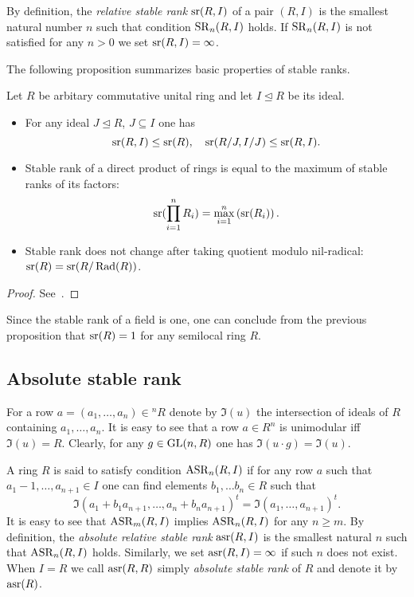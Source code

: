 By definition, the {\it relative stable rank} $\operatorname{sr}(R, I)$ of a pair $(R, I)$ is the smallest natural number $n$ such that condition $\operatorname{SR}_n(R, I)$ holds.
If $\operatorname{SR}_n(R, I)$ is not satisfied for any $n>0$ we set $\operatorname{sr}(R, I)=\infty$.

The following proposition summarizes basic properties of stable ranks.
\begin{prop} \label{prop:sr_properties} Let $R$ be arbitary commutative unital ring and let $I\trianglelefteq R$ be its ideal.
 \begin{itemize}
  \item For any ideal $J\trianglelefteq R$, $J\subseteq I$ one has $$\operatorname{sr}(R, I)\leq\operatorname{sr}(R),\quad \operatorname{sr}(R/J, I/J)\leq \operatorname{sr}(R, I).$$
  \item Stable rank of a direct product of rings is equal to the maximum of stable ranks of its factors: $$\operatorname{sr}(\prod\limits_{i=1}^n R_i) = \max\limits_{i=1}^n\left(\operatorname{sr}(R_i)\right).$$
  \item Stable rank does not change after taking quotient modulo nil-radical: $\operatorname{sr}(R)=\operatorname{sr}(R/\operatorname{Rad}(R))$.
 \end{itemize}\end{prop} \begin{proof} See~\cite{Va71}. \end{proof}

\begin{example} Since the stable rank of a field is one, one can conclude from the previous proposition that $\operatorname{sr}(R)=1$ for any semilocal ring $R$. \end{example}

\subsection{Absolute stable rank}
For a row $a=(a_1,\ldots, a_n) \in {}^n\!R$ denote by $\mathfrak{I}(u)$ the intersection of ideals of $R$ containing $a_1, \ldots, a_n$.
It is easy to see that a row $a\in R^n$ is unimodular iff $\mathfrak{I}(u)=R$. 
Clearly, for any $g\in\operatorname{GL}(n, R)$ one has $\mathfrak{I}(u\cdot g)=\mathfrak{I}(u)$.

A ring $R$ is said to satisfy condition $\operatorname{ASR}_{n}(R, I)$ if for any row $a$ such that $a_1-1,\ldots,a_{n+1}\in I$ 
one can find elements $b_1,\ldots b_n\in R$ such that $$\mathfrak{I}(a_1+b_1a_{n+1},\ldots,a_n+b_na_{n+1})^t= \mathfrak{I}(a_1,\ldots,a_{n+1})^t.$$
It is easy to see that $\operatorname{ASR}_m(R, I)$ implies $\operatorname{ASR}_n(R, I)$ for any $n\ge m$. 
By definition, the {\it absolute relative stable rank} $\operatorname{asr}(R, I)$ is the smallest natural $n$ such that $\operatorname{ASR}_n(R, I)$ holds.
Similarly, we set $\operatorname{asr}(R, I)=\infty$ if such $n$ does not exist. 
When $I=R$ we call $\operatorname{asr}(R, R)$ simply {\it absolute stable rank} of $R$ and denote it by $\operatorname{asr}(R)$.

